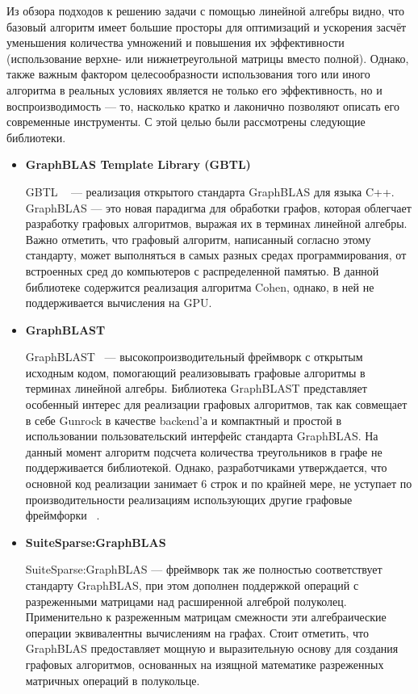 \documentclass[14pt]{matmex-diploma}
\begin{document}
Из обзора подходов к решению задачи с помощью линейной алгебры видно, что базовый алгоритм имеет большие просторы для оптимизаций и ускорения засчёт уменьшения количества умножений и повышения их эффективности (использование верхне- или нижнетреугольной матрицы вместо полной). Однако, также важным фактором целесообразности использования того или иного алгоритма в реальных условиях является не только его эффективность, но и воспроизводимость --- то, насколько кратко и лаконично позволяют описать его современные инструменты. С этой целью были рассмотрены следующие библиотеки.

\begin{itemize}
    \item \textbf{GraphBLAS Template Library (GBTL)}

GBTL ~\cite{Zhang2016GBTLCUDAGA} --- реализация открытого стандарта GraphBLAS для языка C++. GraphBLAS --- это новая парадигма для обработки графов, которая облегчает разработку графовых алгоритмов, выражая их в терминах линейной алгебры. Важно отметить, что графовый алгоритм, написанный согласно этому стандарту, может выполняться в самых разных средах программирования, от встроенных сред до компьютеров с распределенной памятью. В данной библиотеке содержится реализация алгоритма Cohen, однако, в ней не поддерживается вычисления на GPU.

\item \textbf{GraphBLAST}

GraphBLAST~\cite{gr} --- высокопроизводительный фреймворк с открытым исходным кодом, помогающий реализовывать графовые алгоритмы в терминах линейной алгебры. Библиотека GraphBLAST представляет особенный интерес для реализации графовых алгоритмов, так как совмещает в себе Gunrock \cite{gunrockmodel} в качестве backend’а и компактный и простой в использовании пользовательский интерфейс стандарта GraphBLAS. На данный момент алгоритм подсчета количества треугольников в графе не поддерживается библиотекой. Однако, разработчиками утверждается, что основной код реализации занимает 6 строк и по крайней мере, не уступает по производительности реализациям использующих другие графовые фреймфорки ~\cite{gbarticle}.

     
    \item \textbf{SuiteSparse:GraphBLAS} 

SuiteSparse:GraphBLAS --- фреймворк так же полностью соответствует стандарту GraphBLAS, при этом дополнен поддержкой операций с разреженными матрицами над расширенной алгеброй полуколец. Применительно к разреженным матрицам смежности эти алгебраические операции эквивалентны вычислениям на графах. Стоит отметить, что GraphBLAS предоставляет мощную и выразительную основу для создания графовых алгоритмов, основанных на изящной математике разреженных матричных операций в полукольце.


\end{itemize}
\end{document}
